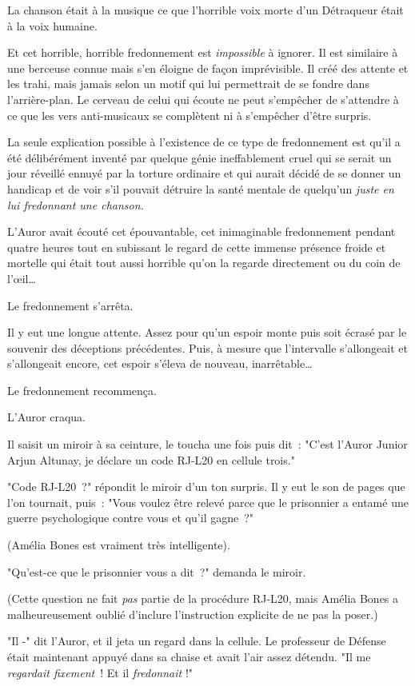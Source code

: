 La chanson était à la musique ce que l'horrible voix morte d'un Détraqueur était à la voix humaine.

Et cet horrible, horrible fredonnement est \emph{impossible} à ignorer. Il est similaire à une berceuse connue mais s'en éloigne de façon imprévisible. Il créé des attente et les trahi, mais jamais selon un motif qui lui permettrait de se fondre dans l'arrière-plan. Le cerveau de celui qui écoute ne peut s'empêcher de s'attendre à ce que les vers anti-musicaux se complètent ni à s'empêcher d'être surpris.

La seule explication possible à l'existence de ce type de fredonnement est qu'il a été délibérément inventé par quelque génie ineffablement cruel qui se serait un jour réveillé ennuyé par la torture ordinaire et qui aurait décidé de se donner un handicap et de voir s'il pouvait détruire la santé mentale de quelqu'un \emph{juste en lui fredonnant une chanson.}

L'Auror avait écouté cet épouvantable, cet inimaginable fredonnement pendant quatre heures tout en subissant le regard de cette immense présence froide et mortelle qui était tout aussi horrible qu'on la regarde directement ou du coin de l'œil…

Le fredonnement s'arrêta.

Il y eut une longue attente. Assez pour qu'un espoir monte puis soit écrasé par le souvenir des déceptions précédentes. Puis, à mesure que l'intervalle s'allongeait et s'allongeait encore, cet espoir s'éleva de nouveau, inarrêtable…

Le fredonnement recommença.

L'Auror craqua.

Il saisit un miroir à sa ceinture, le toucha une fois puis dit~: "C'est l'Auror Junior Arjun Altunay, je déclare un code RJ-L20 en cellule trois."

"Code RJ-L20~?" répondit le miroir d'un ton surpris. Il y eut le son de pages que l'on tournait, puis~: "Vous voulez être relevé parce que le prisonnier a entamé une guerre psychologique contre vous et qu'il gagne~?"

(Amélia Bones est vraiment très intelligente).

"Qu'est-ce que le prisonnier vous a dit~?" demanda le miroir.

(Cette question ne fait \emph{pas} partie de la procédure RJ-L20, mais Amélia Bones a malheureusement oublié d'inclure l'instruction explicite de ne pas la poser.)

"Il -" dit l'Auror, et il jeta un regard dans la cellule. Le professeur de Défense était maintenant appuyé dans sa chaise et avait l'air assez détendu. "Il me \emph{regardait fixement}~! Et il \emph{fredonnait} !"

